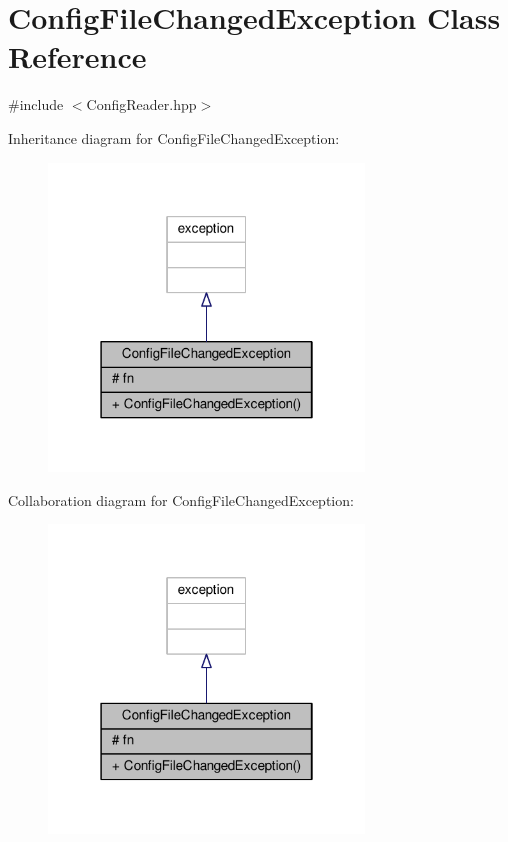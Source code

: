 \hypertarget{class_config_file_changed_exception}{}\section{Config\+File\+Changed\+Exception Class Reference}
\label{class_config_file_changed_exception}


{\ttfamily \#include $<$Config\+Reader.\+hpp$>$}



Inheritance diagram for Config\+File\+Changed\+Exception\+:\nopagebreak
\begin{figure}[H]
\begin{center}
\leavevmode
\includegraphics[width=238pt]{class_config_file_changed_exception__inherit__graph}
\end{center}
\end{figure}


Collaboration diagram for Config\+File\+Changed\+Exception\+:\nopagebreak
\begin{figure}[H]
\begin{center}
\leavevmode
\includegraphics[width=238pt]{class_config_file_changed_exception__coll__graph}
\end{center}
\end{figure}
